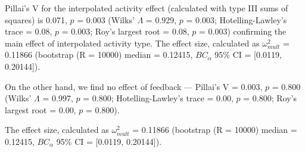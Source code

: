 \documentclass[11pt,]{article}
\begin{document}
Pillai's V for the interpolated activity effect (calculated with type
III sums of squares) is 0.071, \(p\) = 0.003 (Wilks' \(\Lambda\) =
0.929, \(p\) = 0.003; Hotelling-Lawley's trace = 0.08, \(p\) = 0.003;
Roy's largest root = 0.08, \(p\) = 0.003) confirming the main effect of
interpolated activity type. The effect size, calculated as
\(\omega^2_{mult}\) = 0.11866 (bootstrap (R = 10000) median = 0.12415,
\(BC_\alpha\) 95\% CI = {[}0.0119, 0.20144{]}).

On the other hand, we find no effect of feedback --- Pillai's V = 0.003,
\(p\) = 0.800 (Wilks' \(\Lambda\) = 0.997, \(p\) = 0.800;
Hotelling-Lawley's trace = 0.00, \(p\) = 0.800; Roy's largest root =
0.00, \(p\) = 0.800).

The effect size, calculated as \(\omega^2_{mult}\) = 0.11866 (bootstrap
(R = 10000) median = 0.12415, \(BC_\alpha\) 95\% CI = {[}0.0119,
0.20144{]}).

\onecolumn



\end{document}
